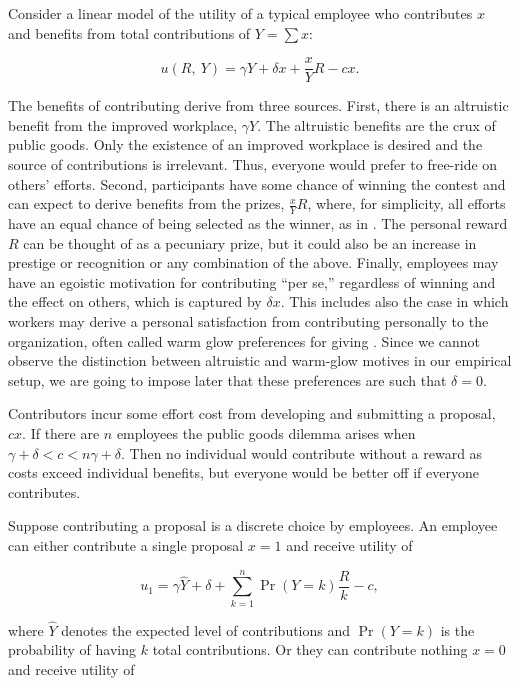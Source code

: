 \documentclass[11pt, titlepage]{article}
\begin{document}
Consider a linear model of the utility of a typical employee who
contributes \(x\) and benefits from total contributions of \(Y=\sum x\):

\begin{equation} \label{eq:utility}
  u(R,~ Y) =  \gamma Y + \delta x + \frac{x}{Y} R - c x.
\end{equation}

The benefits of contributing derive from three sources. First, there is
an altruistic benefit from the improved workplace, \(\gamma Y\). The
altruistic benefits are the crux of public goods. Only the existence of
an improved workplace is desired and the source of contributions is
irrelevant. Thus, everyone would prefer to free-ride on others' efforts.
Second, participants have some chance of winning the contest and can
expect to derive benefits from the prizes, \(\frac{x}{Y} R\), where, for
simplicity, all efforts have an equal chance of being selected as the
winner, as in \citet{morgan2000financing}. The personal reward \(R\) can
be thought of as a pecuniary prize, but it could also be an increase in
prestige or recognition or any combination of the above. Finally,
employees may have an egoistic motivation for contributing ``per se,''
regardless of winning and the effect on others, which is captured by
\(\delta x\). This includes also the case in which workers may derive a
personal satisfaction from contributing personally to the organization,
often called warm glow preferences for giving \citep{andreoni1995warm}.
Since we cannot observe the distinction between altruistic and warm-glow
motives in our empirical setup, we are going to impose later that these
preferences are such that \(\delta=0\).

Contributors incur some effort cost from developing and submitting a
proposal, \(c x\). If there are \(n\) employees the public goods dilemma
arises when \(\gamma+\delta < c < n\gamma+\delta\). Then no individual
would contribute without a reward as costs exceed individual benefits,
but everyone would be better off if everyone contributes.

Suppose contributing a proposal is a discrete choice by employees. An
employee can either contribute a single proposal \(x=1\) and receive
utility of

\begin{equation}
  u_1 = \gamma \hat Y + \delta + \sum_{k=1}^{n}\Pr(Y=k)\frac{R}{k}  - c, 
\end{equation}

where \(\hat Y\) denotes the expected level of contributions and
\(\Pr(Y=k)\) is the probability of having \(k\) total contributions. Or
they can contribute nothing \(x=0\) and receive utility of
\end{document}
